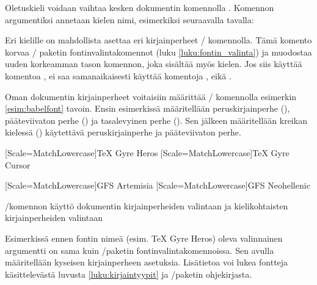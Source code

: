 \begin{koodilohkosis}
\end{koodilohkosis}

Oletuskieli voidaan vaihtaa kesken dokumentin komennolla
. Komennon argumentiksi annetaan kielen nimi,
esimerkiksi seuraavalla tavalla:

\begin{koodilohkosis}
\end{koodilohkosis}

Eri kielille on mahdollista asettaa eri kirjainperheet
\-/ komennolla. Tämä komento korvaa
\-/ paketin fontinvalintakomennot (luku
\ref{luku:fontin_valinta}) ja muodostaa uuden korkeamman tason komennon,
joka sisältää myös kielen. Jos siis käyttää komentoa
, ei saa samanaikaisesti käyttää komentoja
,  eikä .

Oman dokumentin kirjainperheet voitaisiin määrittää
\-/ komennolla esimerkin \ref{esim:babelfont} tavoin.
Ensin esimerkissä määritellään peruskirjainperhe (),
pääteviivaton perhe () ja tasalevyinen perhe (). Sen
jälkeen määritellään kreikan kielessä () käytettävä
peruskirjainperhe ja pääteviivaton perhe.

\begin{esimerkki*}

\begin{koodilohko}
[Scale=MatchLowercase]{TeX Gyre Heros}
[Scale=MatchLowercase]{TeX Gyre Cursor}

[Scale=MatchLowercase]{GFS Artemisia}
[Scale=MatchLowercase]{GFS Neohellenic}
\end{koodilohko}
  \caption{\-/komennon käyttö dokumentin
    kirjainperheiden valintaan ja kielikohtaisten kirjainperheiden
    valintaan}
  \label{esim:babelfont}
\end{esimerkki*}

Esimerkissä ennen fontin nimeä (esim. TeX Gyre Heros) oleva valinnainen
argumentti on sama kuin \-/paketin
fontinvalintakomennoissa. Sen avulla määritellään kyseisen
kirjainperheen asetuksia. Lisätietoa voi lukea fontteja käsittelevästä
luvusta \ref{luku:kirjaintyypit} ja \-/paketin
ohjekirjasta.

